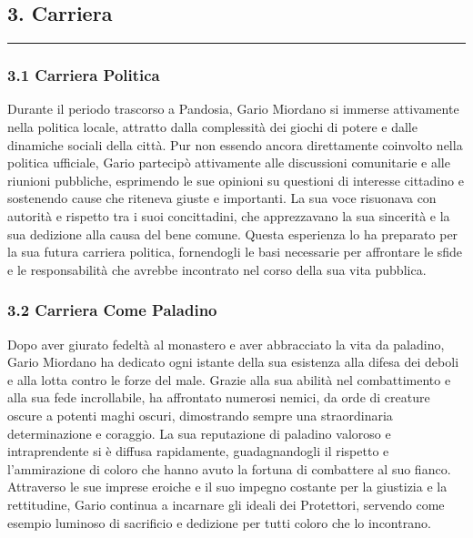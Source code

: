 \subsection{3. Carriera}\label{carriera}

\begin{center}\rule{0.5\linewidth}{0.5pt}\end{center}

\subsubsection{3.1 Carriera Politica}\label{carriera-politica}

Durante il periodo trascorso a Pandosia, Gario Miordano si immerse
attivamente nella politica locale, attratto dalla complessità dei giochi
di potere e dalle dinamiche sociali della città. Pur non essendo ancora
direttamente coinvolto nella politica ufficiale, Gario partecipò
attivamente alle discussioni comunitarie e alle riunioni pubbliche,
esprimendo le sue opinioni su questioni di interesse cittadino e
sostenendo cause che riteneva giuste e importanti. La sua voce risuonava
con autorità e rispetto tra i suoi concittadini, che apprezzavano la sua
sincerità e la sua dedizione alla causa del bene comune. Questa
esperienza lo ha preparato per la sua futura carriera politica,
fornendogli le basi necessarie per affrontare le sfide e le
responsabilità che avrebbe incontrato nel corso della sua vita pubblica.

\subsubsection{\texorpdfstring{\textbf{3.2 Carriera Come
Paladino}}{3.2 Carriera Come Paladino}}\label{carriera-come-paladino}

Dopo aver giurato fedeltà al monastero e aver abbracciato la vita da
paladino, Gario Miordano ha dedicato ogni istante della sua esistenza
alla difesa dei deboli e alla lotta contro le forze del male. Grazie
alla sua abilità nel combattimento e alla sua fede incrollabile, ha
affrontato numerosi nemici, da orde di creature oscure a potenti maghi
oscuri, dimostrando sempre una straordinaria determinazione e coraggio.
La sua reputazione di paladino valoroso e intraprendente si è diffusa
rapidamente, guadagnandogli il rispetto e l'ammirazione di coloro che
hanno avuto la fortuna di combattere al suo fianco. Attraverso le sue
imprese eroiche e il suo impegno costante per la giustizia e la
rettitudine, Gario continua a incarnare gli ideali dei Protettori,
servendo come esempio luminoso di sacrificio e dedizione per tutti
coloro che lo incontrano.

